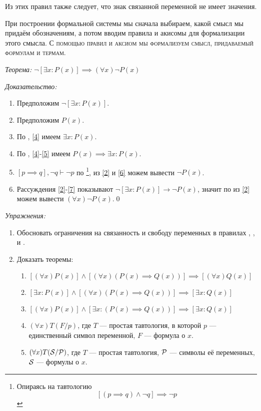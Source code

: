 Из этих правил также следует, что знак связанной переменной не имеет значения.

При построении формальной системы мы сначала
выбираем, какой смысл мы придаём обозначениям, а потом вводим
правила и акисомы для формализации этого смысла.
\textsc{С помощью правил и аксиом мы формализуем смысл, придаваемый формулам и термам.}

\vspace{1em}
{\it Теорема:} $\lnot [\exists x:P(x)]\implies  (\forall x)\lnot P(x)$

{\it Доказательство:}
\begin{enumerate}[label=(\arabic*)]
  \item{}\label{2}Предположим $\lnot [\exists x:P(x)]$.
  \item{}\label{4}Предположим $P(x)$.
  \item{}\label{5}По \Eii{}, \ref{4} имеем $\exists x:P(x)$.
  \item{}\label{6}По \implic{}, \ref{4}-\ref{5} имеем
  $P(x)\implies \exists x:P(x)$.
  \item{}\label{7}${[p\implies q],\lnot q\vdash \lnot p}$ по \taut{}\footnote{
    Опираясь на тавтологию
    \[
      [(p\implies q)\land\lnot q]\implies\lnot p
    \]
  }, из
  \ref{2} и \ref{6} можем вывести $\lnot P(x)$.
  \item{}\label{8}Рассуждения \ref{2}-\ref{7} показывают
  $\lnot[\exists x:P(x)]\to\lnot P(x)$, значит по \Aii{} из \ref{2} можем
  вывести $(\forall x)\lnot P(x)$.\qed
\end{enumerate}

\pagebreak
{\it Упражнения:}
\begin{enumerate}
  \item{}Обосновать ограничения на связанность и свободу переменных в правилах
  \Aii{}, \Aee{}, \Eii{} и \Eee{}.
  \item{}\label{ex:obv_thm}Доказать теоремы:
  \begin{enumerate}
    \item{}$[(\forall x)P(x)]\land[(\forall x)(P(x)\implies Q(x))]
      \implies [(\forall x)Q(x)]$\label{thm:obv_forall}
    \item{}$[\exists x:P(x)]\land[(\forall x)(P(x)\implies Q(x))]
      \implies [\exists x:Q(x)]$
    \item{}$[(\forall x)P(x)]\land [\exists x:(P(x)\implies Q(x))]
      \implies [\exists x:Q(x)]$
    \item{}$(\forall x)T(F/p)$, где $T$ --- простая тавтология,
    в которой $p$ --- единственный символ переменной, $F$ --- формула о $x$.
    \item{}$(\forall x)T(\mathcal S/\mathcal P)$, где $T$ --- простая тавтология,
    $\mathcal P$ --- символы её переменных, $\mathcal S$ --- формулы о $x$.\label{thm:obv_taut}
  \end{enumerate}
\end{enumerate}

